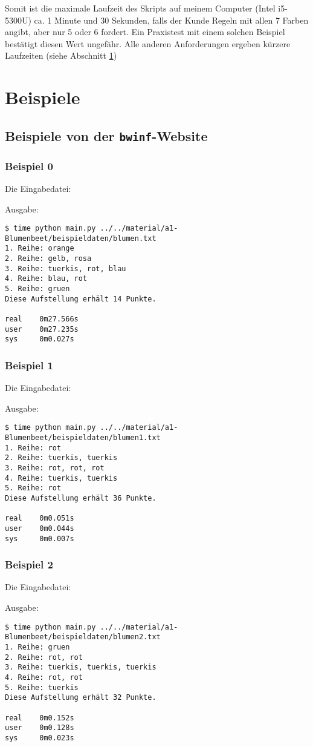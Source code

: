 \documentclass[a4paper,10pt,ngerman]{scrartcl}
\begin{document}
Somit ist die maximale Laufzeit des Skripts auf meinem Computer (Intel i5-5300U) ca. 1 Minute und 30 Sekunden, falls der Kunde Regeln mit allen 7 Farben angibt, aber nur 5 oder 6 fordert.
Ein Praxistest mit einem solchen Beispiel bestätigt diesen Wert ungefähr.
Alle anderen Anforderungen ergeben kürzere Laufzeiten (siehe Abschnitt \ref{sec:examples})


\section{Beispiele}
\label{sec:examples}

\subsection{Beispiele von der \texttt{bwinf}-Website}

\subsubsection{Beispiel 0}
Die Eingabedatei:

Ausgabe:
\begin{lstlisting}
$ time python main.py ../../material/a1-Blumenbeet/beispieldaten/blumen.txt 
1. Reihe: orange
2. Reihe: gelb, rosa
3. Reihe: tuerkis, rot, blau
4. Reihe: blau, rot
5. Reihe: gruen
Diese Aufstellung erhält 14 Punkte.

real    0m27.566s
user    0m27.235s
sys     0m0.027s
\end{lstlisting}

\subsubsection{Beispiel 1}
Die Eingabedatei:

Ausgabe:
\begin{lstlisting}
$ time python main.py ../../material/a1-Blumenbeet/beispieldaten/blumen1.txt 
1. Reihe: rot
2. Reihe: tuerkis, tuerkis
3. Reihe: rot, rot, rot
4. Reihe: tuerkis, tuerkis
5. Reihe: rot
Diese Aufstellung erhält 36 Punkte.

real    0m0.051s
user    0m0.044s
sys     0m0.007s
\end{lstlisting}

\subsubsection{Beispiel 2}
Die Eingabedatei:

Ausgabe:
\begin{lstlisting}
$ time python main.py ../../material/a1-Blumenbeet/beispieldaten/blumen2.txt 
1. Reihe: gruen
2. Reihe: rot, rot
3. Reihe: tuerkis, tuerkis, tuerkis
4. Reihe: rot, rot
5. Reihe: tuerkis
Diese Aufstellung erhält 32 Punkte.

real    0m0.152s
user    0m0.128s
sys     0m0.023s
\end{lstlisting}
\end{document}
